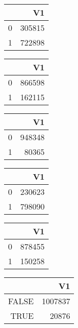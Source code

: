 \bigskip\bigskip
\centering
\begin{tabular}{rr}
  \hline
 & V1 \\ 
  \hline
0 & 305815 \\ 
  1 & 722898 \\ 
   \hline
\end{tabular}

\bigskip\bigskip
\centering
\begin{tabular}{rr}
  \hline
 & V1 \\ 
  \hline
0 & 866598 \\ 
  1 & 162115 \\ 
   \hline
\end{tabular}

\bigskip\bigskip
\centering
\begin{tabular}{rr}
  \hline
 & V1 \\ 
  \hline
0 & 948348 \\ 
  1 & 80365 \\ 
   \hline
\end{tabular}

\bigskip\bigskip
\centering
\begin{tabular}{rr}
  \hline
 & V1 \\ 
  \hline
0 & 230623 \\ 
  1 & 798090 \\ 
   \hline
\end{tabular}

\bigskip\bigskip
\centering
\begin{tabular}{rr}
  \hline
 & V1 \\ 
  \hline
0 & 878455 \\ 
  1 & 150258 \\ 
   \hline
\end{tabular}

\bigskip\bigskip
\centering
\begin{tabular}{rr}
  \hline
 & V1 \\ 
  \hline
FALSE & 1007837 \\ 
  TRUE & 20876 \\ 
   \hline
\end{tabular}


